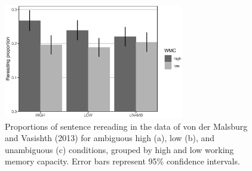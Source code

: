 \documentclass{cambridge7A}\usepackage[]{graphicx}\usepackage[]{color}
\newenvironment{knitrout}{}{} %
\begin{document}



\begin{figure}[!htbp]
\centering
\begin{knitrout}
\color{fgcolor}

{\centering \includegraphics[width=0.7\textwidth]{figures/fig-mv13datarer-1} 

}



\end{knitrout}
  \caption[Proportions of sentence rereading by working memory capacity in the data of von der Malsburg and Vasishth (2013).]{Proportions of sentence rereading in the data of von der Malsburg and Vasishth (2013) for ambiguous high (a), low (b), and unambiguous (c) conditions, grouped by high and low working memory capacity. Error bars represent 95\% confidence intervals.}
  \label{fig:mv13data:rer}
\end{figure}
\end{document}
